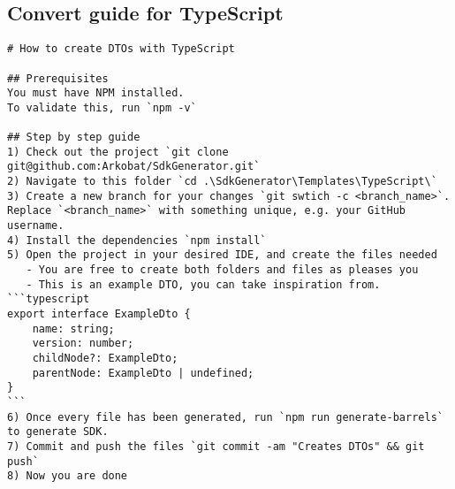 \subsection{Convert guide for TypeScript}
\begin{lstlisting}[caption={DTO conversion guide for TypeScript}, label={code:convert_guide_typescript}, style=base]
# How to create DTOs with TypeScript

## Prerequisites
You must have NPM installed.
To validate this, run `npm -v`

## Step by step guide
1) Check out the project `git clone git@github.com:Arkobat/SdkGenerator.git`
2) Navigate to this folder `cd .\SdkGenerator\Templates\TypeScript\`
3) Create a new branch for your changes `git swtich -c <branch_name>`. Replace `<branch_name>` with something unique, e.g. your GitHub username.
4) Install the dependencies `npm install`
5) Open the project in your desired IDE, and create the files needed
   - You are free to create both folders and files as pleases you
   - This is an example DTO, you can take inspiration from.
```typescript
export interface ExampleDto {
    name: string;
    version: number;
    childNode?: ExampleDto;
    parentNode: ExampleDto | undefined;
}
```
6) Once every file has been generated, run `npm run generate-barrels` to generate SDK.
7) Commit and push the files `git commit -am "Creates DTOs" && git push`
8) Now you are done
\end{lstlisting}